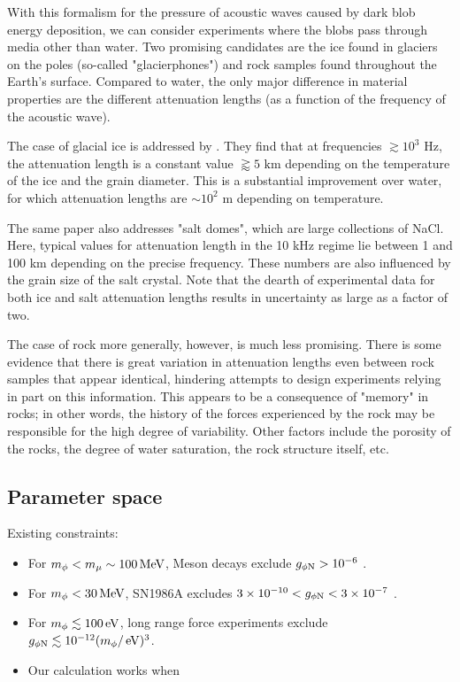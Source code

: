 \documentclass[%
 reprint,
 amsmath,amssymb,
 aps,nofootinbib
]{revtex4-1}
\newcommand{\eV}{\mathinner{\mathrm{eV}}}
\newcommand{\MeV}{\mathinner{\mathrm{MeV}}}
\begin{document}
With this formalism for the pressure of acoustic waves caused by dark blob energy deposition, we can consider experiments where the blobs pass through media other than water. Two promising candidates are the ice found in glaciers on the poles (so-called "glacierphones") and rock samples found throughout the Earth's surface. Compared to water, the only major difference in material properties are the different attenuation lengths (as a function of the frequency of the acoustic wave).

The case of glacial ice is addressed by \citep{Price:2006}. They find that at frequencies $\gtrsim 10^3 \text{ Hz}$, the attenuation length is a constant value $\gtrapprox 5 \text{ km}$ depending on the temperature of the ice and the grain diameter. This is a substantial improvement over water, for which attenuation lengths are $\sim 10^2 \text{ m}$ depending on temperature.

The same paper also addresses "salt domes", which are large collections of NaCl. Here, typical values for attenuation length in the 10 kHz regime lie between 1 and 100 km depending on the precise frequency. These numbers are also influenced by the grain size of the salt crystal. Note that the dearth of experimental data for both ice and salt attenuation lengths results in uncertainty as large as a factor of two.

The case of rock more generally, however, is much less promising. There is some evidence \citep{Buckingham:1997} that there is great variation in attenuation lengths even between rock samples that appear identical, hindering attempts to design experiments relying in part on this information. This appears to be a consequence of "memory" in rocks; in other words, the history of the forces experienced by the rock may be responsible for the high degree of variability. Other factors include the porosity of the rocks, the degree of water saturation, the rock structure itself, etc.

\subsection{Parameter space}
Existing constraints:
\begin{itemize}
    \item For $m_\phi<m_\mu\sim 100\MeV$, Meson decays exclude $g_{\phi\rm N}>10^{-6}$ \citep{Grabowska:2018lnd}.
    \item For $m_\phi<30\MeV$, SN1986A excludes $3\times 10^{-10}<g_{\phi \rm N}<3\times 10^{-7}$ \cite{Grabowska:2018lnd}.
    \item For $m_\phi\lesssim 100\eV$, long range force experiments exclude $g_{\phi\rm N}\lesssim 10^{-12} (m_\phi/\eV)^3$\cite{Grabowska:2018lnd}.
    \item Our calculation works when 
\end{itemize}
\end{document}
